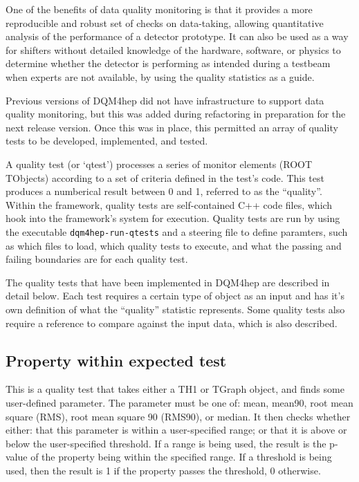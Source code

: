 One of the benefits of data quality monitoring is that it provides a more reproducible and robust set of checks on data-taking, allowing quantitative analysis of the performance of a detector prototype. It can also be used as a way for shifters without detailed knowledge of the hardware, software, or physics to determine whether the detector is performing as intended during a testbeam when experts are not available, by using the quality statistics as a guide.

Previous versions of DQM4hep did not have infrastructure to support data quality monitoring, but this was added during refactoring in preparation for the next release version. Once this was in place, this permitted an array of quality tests to be developed, implemented, and tested. 

A quality test (or `qtest') processes a series of monitor elements (ROOT TObjects) according to a set of criteria defined in the test's code. This test produces a numberical result between 0 and 1, referred to as the ``quality''. Within the framework, quality tests are self-contained C++ code files, which hook into the framework's system for execution. Quality tests are run by using the executable \texttt{dqm4hep-run-qtests} and a steering file to define paramters, such as which files to load, which quality tests to execute, and what the passing and failing boundaries are for each quality test. 

The quality tests that have been implemented in DQM4hep are described in detail below. Each test requires a certain type of object as an input and has it's own definition of what the ``quality'' statistic represents. Some quality tests also require a reference to compare against the input data, which is also described.


\subsection{Property within expected test}
This is a quality test that takes either a TH1 or TGraph object, and finds some user-defined parameter. The parameter must be one of: mean, mean90, root mean square (RMS), root mean square 90 (RMS90), or median. It then checks whether either: that this parameter is within a user-specified range; or that it is above or below the user-specified threshold. If a range is being used, the result is the p-value of the property being within the specified range. If a threshold is being used, then the result is 1 if the property passes the threshold, 0 otherwise.

